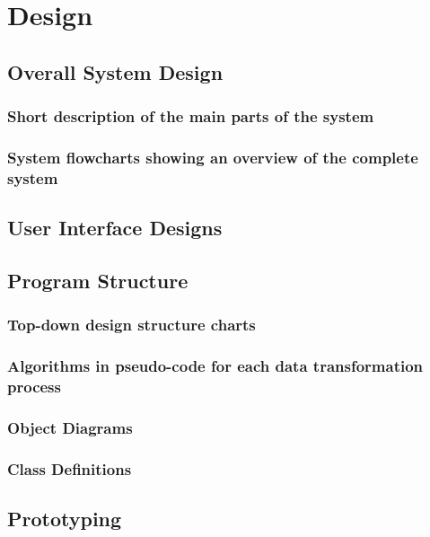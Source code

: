 \chapter{Design}

\section{Overall System Design}

\subsection{Short description of the main parts of the system}

\subsection{System flowcharts showing an overview of the complete system}

\section{User Interface Designs}

\section{Program Structure}

\subsection{Top-down design structure charts}

\subsection{Algorithms in pseudo-code for each data transformation process}

\subsection{Object Diagrams}

\subsection{Class Definitions}

\section{Prototyping}

